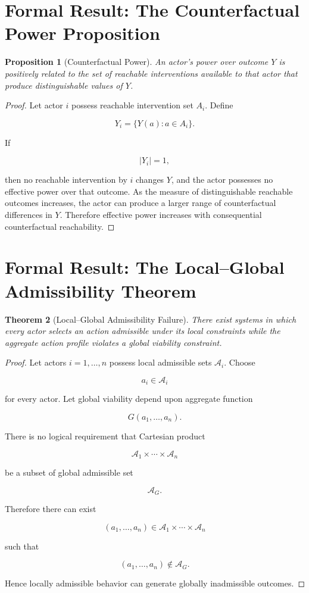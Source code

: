 \documentclass[11pt,oneside]{book}
\newtheorem{theorem}{Theorem}[chapter]
\newtheorem{proposition}[theorem]{Proposition}
\theoremstyle{definition}
\theoremstyle{remark}
\newcommand{\A}{\mathcal{A}}
\begin{document}
\section{Formal Result: The Counterfactual Power Proposition}

\begin{proposition}[Counterfactual Power]
An actor's power over outcome \(Y\) is positively related to the set of reachable interventions available to that actor that produce distinguishable values of \(Y\).
\end{proposition}

\begin{proof}
Let actor \(i\) possess reachable intervention set \(A_i\). Define

\[
Y_i
=
\{Y(a):a\in A_i\}.
\]

If

\[
|Y_i|=1,
\]

then no reachable intervention by \(i\) changes \(Y\), and the actor possesses no effective power over that outcome. As the measure of distinguishable reachable outcomes increases, the actor can produce a larger range of counterfactual differences in \(Y\). Therefore effective power increases with consequential counterfactual reachability.
\end{proof}

\section{Formal Result: The Local--Global Admissibility Theorem}

\begin{theorem}[Local--Global Admissibility Failure]
There exist systems in which every actor selects an action admissible under its local constraints while the aggregate action profile violates a global viability constraint.
\end{theorem}

\begin{proof}
Let actors \(i=1,\ldots,n\) possess local admissible sets \(\A_i\). Choose

\[
a_i\in\A_i
\]

for every actor. Let global viability depend upon aggregate function

\[
G(a_1,\ldots,a_n).
\]

There is no logical requirement that Cartesian product

\[
\A_1\times\cdots\times\A_n
\]

be a subset of global admissible set

\[
\A_G.
\]

Therefore there can exist

\[
(a_1,\ldots,a_n)
\in
\A_1\times\cdots\times\A_n
\]

such that

\[
(a_1,\ldots,a_n)\notin\A_G.
\]

Hence locally admissible behavior can generate globally inadmissible outcomes.
\end{proof}
\end{document}

